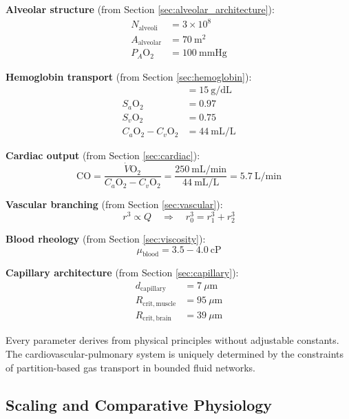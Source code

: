 \documentclass[12pt,a4paper]{article}
\theoremstyle{remark}
\begin{document}
\textbf{Alveolar structure} (from Section \ref{sec:alveolar_architecture}):
\begin{align}
N_{\mathrm{alveoli}} &= 3 \times 10^{8} \\
A_{\mathrm{alveolar}} &= 70~\mathrm{m}^{2} \\
P_{A}\mathrm{O}_{2} &= 100~\mathrm{mmHg}
\end{align}

\textbf{Hemoglobin transport} (from Section \ref{sec:hemoglobin}):
\begin{align}
[\mathrm{Hb}] &= 15~\mathrm{g/dL} \\
S_{a}\mathrm{O}_{2} &= 0.97 \\
S_{v}\mathrm{O}_{2} &= 0.75 \\
C_{a}\mathrm{O}_{2} - C_{v}\mathrm{O}_{2} &= 44~\mathrm{mL/L}
\end{align}

\textbf{Cardiac output} (from Section \ref{sec:cardiac}):
\begin{equation}
\mathrm{CO} = \frac{\dot{V}\mathrm{O}_{2}}{C_{a}\mathrm{O}_{2} - C_{v}\mathrm{O}_{2}} = \frac{250~\mathrm{mL/min}}{44~\mathrm{mL/L}} = 5.7~\mathrm{L/min}
\end{equation}

\textbf{Vascular branching} (from Section \ref{sec:vascular}):
\begin{equation}
r^{3} \propto Q \quad \Rightarrow \quad r_{0}^{3} = r_{1}^{3} + r_{2}^{3}
\end{equation}

\textbf{Blood rheology} (from Section \ref{sec:viscosity}):
\begin{equation}
\mu_{\mathrm{blood}} = 3.5-4.0~\mathrm{cP}
\end{equation}

\textbf{Capillary architecture} (from Section \ref{sec:capillary}):
\begin{align}
d_{\mathrm{capillary}} &= 7~\mu\mathrm{m} \\
R_{\mathrm{crit,muscle}} &= 95~\mu\mathrm{m} \\
R_{\mathrm{crit,brain}} &= 39~\mu\mathrm{m}
\end{align}

Every parameter derives from physical principles without adjustable constants. The cardiovascular-pulmonary system is uniquely determined by the constraints of partition-based gas transport in bounded fluid networks.

\subsection{Scaling and Comparative Physiology}
\end{document}
